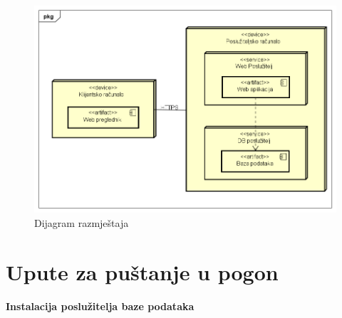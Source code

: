			\begin{figure}[H]
				\includegraphics[scale=0.65]{dijagrami/DijagramRazmjestaja.png}
				\centering
				\caption{Dijagram razmještaja}
				\label{fig:dijagram razmjestaja}
			\end{figure}

			\eject 
		
		\section{Upute za puštanje u pogon}
			\noindent \textbf{Instalacija poslužitelja baze podataka}
			
